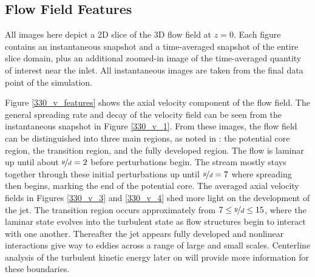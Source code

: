 \subsection{Flow Field Features}
All images here depict a 2D slice of the 3D flow field at $z=0$. Each figure contains an instantaneous snapshot and a time-averaged snapshot of the entire slice domain, plus an additional zoomed-in image of the time-averaged quantity of interest near the inlet. All instantaneous images are taken from the final data point of the simulation.

Figure \ref{330_v_features} shows the axial velocity component of the flow field. The general spreading rate and decay of the velocity field can be seen from the instantaneous snapshot in Figure \ref{330_v_1}. From these images, the flow field can be distinguished into three main regions, as noted in \cite{iso_comp_1_ref_1}: the potential core region, the transition region, and the fully developed region. The flow is laminar up until about $\nicefrac{y}{d}=2$ before perturbations begin. The stream mostly stays together through these initial perturbations up until $\nicefrac{y}{d}=7$ where spreading then begins, marking the end of the potential core. The averaged axial velocity fields in Figures \ref{330_v_3} and \ref{330_v_4} shed more light on the development of the jet. The transition region occurs approximately from $7 \leq \nicefrac{y}{d} \leq 15$, where the laminar state evolves into the turbulent state as flow structures begin to interact with one another. Thereafter the jet appears fully developed and nonlinear interactions give way to eddies across a range of large and small scales. Centerline analysis of the turbulent kinetic energy later on will provide more information for these boundaries.  

